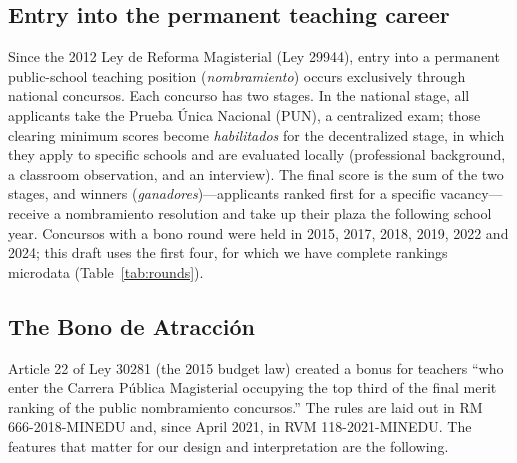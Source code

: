 \documentclass[11pt]{article}
\begin{document}
\subsection{Entry into the permanent teaching career}

Since the 2012 Ley de Reforma Magisterial (Ley 29944), entry into a permanent
public-school teaching position (\emph{nombramiento}) occurs exclusively
through national concursos. Each concurso has two stages. In the national
stage, all applicants take the Prueba \'Unica Nacional (PUN), a centralized
exam; those clearing minimum scores become \emph{habilitados} for the
decentralized stage, in which they apply to specific schools and are evaluated
locally (professional background, a classroom observation, and an interview).
The final score is the sum of the two stages, and winners
(\emph{ganadores})---applicants ranked first for a specific vacancy---receive
a nombramiento resolution and take up their plaza the following school year.
Concursos with a bono round were held in 2015, 2017, 2018, 2019, 2022 and
2024; this draft uses the first four, for which we have complete rankings
microdata (Table~\ref{tab:rounds}).

\subsection{The Bono de Atracci\'on}

Article 22 of Ley 30281 (the 2015 budget law) created a bonus for teachers
``who enter the Carrera P\'ublica Magisterial occupying the top third of the
final merit ranking of the public nombramiento concursos.'' The rules are laid
out in RM 666-2018-MINEDU and, since April 2021, in RVM 118-2021-MINEDU.
The features that matter for our design and interpretation are the following.
\end{document}
